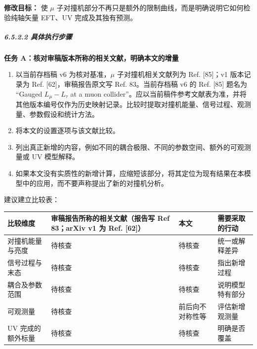 \documentclass[
  chinese,
  UTF8]{ctexart}
\newcounter{none} %
\providecommand{\tightlist}{%
  \setlength{\itemsep}{0pt}\setlength{\parskip}{0pt}}
\begin{document}
\textbf{修改目标：} 使 \ensuremath{\mu}
子对撞机部分不再只是额外的限制曲线，而是明确说明它如何检验纯轴矢量
EFT、UV 完成及其独有预测。

\subparagraph{6.5.2.2
具体执行步骤}\label{ux5177ux4f53ux6267ux884cux6b65ux9aa4-3}

\textbf{任务 A：核对审稿版本所称的相关文献，明确本文的增量}

\begin{enumerate}
\def\labelenumi{\arabic{enumi}.}
\tightlist
\item
  以当前存档稿 v6 为核对基准，\ensuremath{\mu} 子对撞机相关文献列为 Ref.
  {[}85{]}；v1 版本记录为 Ref. {[}62{]}，审稿报告原文写 Ref.
  83。当前存档稿 v6 的 Ref. {[}85{]} 题名为 ``Gauged \(L_\mu-L_\tau\) at
  a muon
  collider''。应以当前稿件参考文献表为准，并将其他版本编号仅作为历史映射记录。比较时提取对撞机能量、信号过程、观测量、参数假设和统计方法。
\item
  将本文的设置逐项与该文献比较。
\item
  列出真正新增的内容，例如不同的耦合极限、不同的参数空间、额外的可观测量或
  UV 模型解释。
\item
  如果本文没有实质性的新增计算，应缩短该部分，将其定位为现有结果在本模型中的应用，而不要声称提出了新的对撞机分析。
\end{enumerate}

建议建立比较表：

{\def\LTcaptype{none} %
\begin{longtable}[]{@{}
  >{\raggedright\arraybackslash}p{}
  >{\raggedright\arraybackslash}p{}
  >{\raggedright\arraybackslash}p{}
  >{\raggedright\arraybackslash}p{}@{}}
\toprule\noalign{}
\begin{minipage}[b]{\linewidth}\raggedright
比较维度
\end{minipage} & \begin{minipage}[b]{\linewidth}\raggedright
审稿报告所称的相关文献（报告写 Ref 83；arXiv v1 为 Ref. {[}62{]}）
\end{minipage} & \begin{minipage}[b]{\linewidth}\raggedright
本文
\end{minipage} & \begin{minipage}[b]{\linewidth}\raggedright
需要采取的行动
\end{minipage} \\
\midrule\noalign{}
\endhead
\bottomrule\noalign{}
\endlastfoot
对撞机能量与亮度 & 待核查 & 待核查 & 统一或解释差异 \\
信号过程与末态 & 待核查 & 待核查 & 指出新增过程 \\
耦合及参数范围 & 待核查 & 待核查 & 说明模型特有部分 \\
可观测量 & 待核查 & 前后向不对称性等 & 评估新增观测量 \\
UV 完成的额外标量 & 待核查 & 待核查 & 明确是否覆盖 \\
\end{longtable}
}
\end{document}
